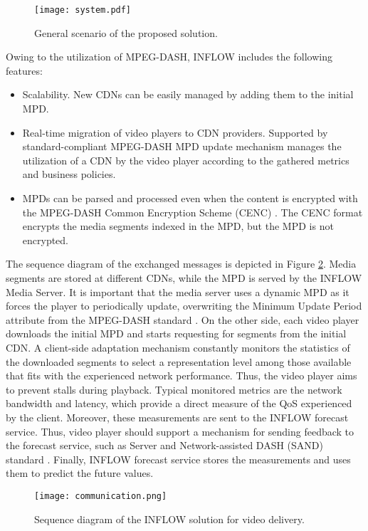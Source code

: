 \begin{figure}[htp]
	\centering
	\texttt{[image: system.pdf]}
	\caption{General scenario of the proposed solution.}
	\label{fig:IEEETBC2020scenario}
\end{figure}

Owing to the utilization of MPEG-DASH, INFLOW includes the following features:
\begin{itemize}
	\item Scalability. New CDNs can be easily managed by adding them to the initial MPD.
	\item Real-time migration of video players to CDN providers. Supported by standard-compliant MPEG-DASH MPD update mechanism manages the utilization of a CDN by the video player according to the gathered metrics and business policies.
	\item MPDs can be parsed and processed even when the content is encrypted with the MPEG-DASH Common Encryption Scheme (CENC) \cite{isocenc}. The CENC format encrypts the media segments indexed in the MPD, but the MPD is not encrypted.
\end{itemize}

The sequence diagram of the exchanged messages is depicted in Figure \ref{fig:IEEETBC2020seqdiag2}. Media segments are stored at different CDNs, while the MPD is served by the INFLOW Media Server. It is important that the media server uses a dynamic MPD as it forces the player to periodically update, overwriting the Minimum Update Period attribute from the MPEG-DASH standard \cite{lohmar2011}. On the other side, each video player downloads the initial MPD and starts requesting for segments from the initial CDN. A client-side adaptation mechanism constantly monitors the statistics of the downloaded segments to select a representation level among those available that fits with the experienced network performance. Thus, the video player aims to prevent stalls during playback. Typical monitored metrics are the network bandwidth and latency, which provide a direct measure of the QoS experienced by the client. Moreover, these measurements are sent to the INFLOW forecast service. Thus, video player should support a mechanism for sending feedback to the forecast service, such as Server and Network-assisted DASH (SAND) standard \cite{thomas2016}. Finally, INFLOW forecast service stores the measurements and uses them to predict the future values.

\begin{figure}[htp]
	\centering
	\texttt{[image: communication.png]}
	\caption{Sequence diagram of the INFLOW solution for video delivery.}
	\label{fig:IEEETBC2020seqdiag2}
\end{figure}

